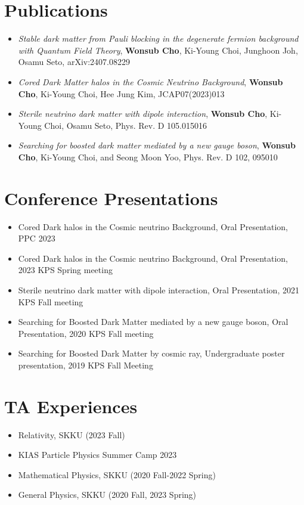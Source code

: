 \documentclass{article}
\begin{document}
\section{Publications}
\begin{itemize}
	\item \emph{Stable dark matter from Pauli blocking in the degenerate fermion background with Quantum Field Theory}, \textbf{Wonsub Cho}, Ki-Young Choi, Junghoon Joh, Osamu Seto, arXiv:2407.08229
	\item \emph{Cored Dark Matter halos in the Cosmic Neutrino Background}, \textbf{Wonsub Cho}, Ki-Young Choi, Hee Jung Kim, JCAP07(2023)013
	\item \emph{Sterile neutrino dark matter with dipole interaction}, \textbf{Wonsub Cho}, Ki-Young Choi, Osamu Seto, Phys. Rev. D 105.015016
	\item \emph{Searching for boosted dark matter mediated by a new gauge boson}, \textbf{Wonsub Cho}, Ki-Young Choi, and Seong Moon Yoo, Phys. Rev. D 102, 095010
\end{itemize}

\section{Conference Presentations}
    \begin{itemize}
    \item Cored Dark halos in the Cosmic neutrino Background, Oral Presentation, PPC 2023
    \item Cored Dark halos in the Cosmic neutrino Background, Oral Presentation, 2023 KPS Spring meeting
    \item Sterile neutrino dark matter with dipole interaction, Oral Presentation, 2021 KPS Fall meeting
    \item Searching for Boosted Dark Matter mediated by a new gauge boson, Oral Presentation, 2020 KPS Fall meeting
    \item Searching for Boosted Dark Matter by cosmic ray, Undergraduate poster presentation, 2019 KPS Fall Meeting
    \end{itemize}

\section{TA Experiences}
    \begin{itemize}
        \item Relativity, SKKU (2023 Fall)
        \item KIAS Particle Physics Summer Camp 2023
    	\item Mathematical Physics, SKKU (2020 Fall-2022 Spring)
    	\item General Physics, SKKU (2020 Fall, 2023 Spring)
    \end{itemize}
\end{document}
